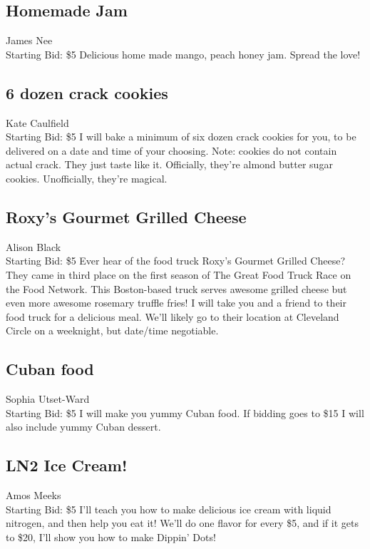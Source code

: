 \documentclass[11pt]{article}
\begin{document}
\subsection{Homemade Jam}
James Nee
\\
Starting Bid: \$5
\newline
Delicious home made mango, peach honey jam. Spread the love!
\subsection{6 dozen crack cookies}
Kate Caulfield
\\
Starting Bid: \$5
\newline
I will bake a minimum of six dozen crack cookies for you, to be delivered on a date and time of your choosing. Note: cookies do not contain actual crack. They just taste like it. Officially, they're almond butter sugar cookies. Unofficially, they're magical.
\subsection{Roxy's Gourmet Grilled Cheese}
Alison Black
\\
Starting Bid: \$5
\newline
Ever hear of the food truck Roxy's Gourmet Grilled Cheese?  They came in third place on the first season of The Great Food Truck Race on the Food Network.  This Boston-based truck serves awesome grilled cheese but even more awesome rosemary truffle fries!  I will take you and a friend to their food truck for a delicious meal.  We'll likely go to their location at Cleveland Circle on a weeknight, but date/time negotiable.
\subsection{Cuban food}
Sophia Utset-Ward
\\
Starting Bid: \$5
\newline
I will make you yummy Cuban food. If bidding goes to \$15 I will also include yummy Cuban dessert.
\subsection{LN2 Ice Cream!}
Amos Meeks
\\
Starting Bid: \$5
\newline
I'll teach you how to make delicious ice cream with liquid nitrogen, and then help you eat it! We'll do one flavor for every \$5, and if it gets to \$20, I'll show you how to make Dippin' Dots!
\end{document}
